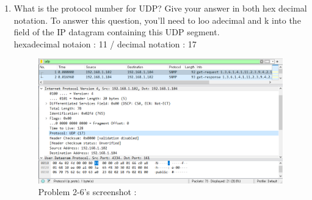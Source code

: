 \begin{enumerate}[label=\bfseries Problem \arabic*:,leftmargin=*,labelindent=1em]
        \item What is the protocol number for UDP? 
        Give your answer in both hex decimal notation. 
        To answer this question, you’ll need to loo adecimal and k into the field of the IP datagram containing this UDP segment.\\[0.2mm]
        \soln hexadecimal notaion : 11  /  decimal notation : 17
        \begin{figure}[!h]\centering
        \hspace{15mm}  
    		\includegraphics[width=.85\textwidth]{image/week02/2-6-1}
    		\caption{\footnotesize Problem 2-6's screenshot : }
    		\vspace{-10pt}
        \end{figure}
    \end{enumerate}
\newpage
